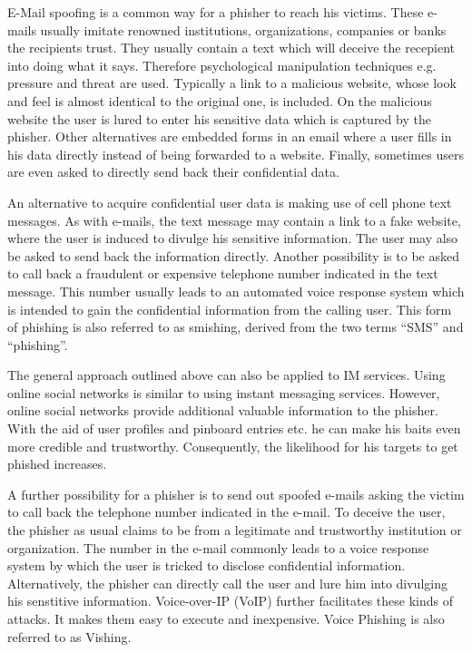 \label{s:attack_channels}
\begin{description}[leftmargin=0cm]
	\item[E-Mail] E-Mail spoofing is a common way for a phisher to reach his victims.
 These e-mails usually imitate renowned institutions, organizations, companies or banks the recipients trust.
 They usually contain a text which will deceive the recepient into doing what it says. Therefore psychological manipulation techniques e.g. pressure and threat are used.
 Typically a link to a malicious website, whose look and feel is almost identical to the original one, is included.
 On the malicious website the user is lured to enter his sensitive data which is captured by the phisher.
 Other alternatives are embedded forms in an email where a user fills in his data directly instead of being forwarded to a website.
 Finally, sometimes users are even asked to directly send back their confidential data.

	\item[SMS] An alternative to acquire confidential user data is making use of cell phone text messages.
 As with e-mails, the text message may contain a link to a fake website, where the user is induced to divulge his sensitive information.
 The user may also be asked to send back the information directly.
 Another possibility is to be asked to call back a fraudulent or expensive telephone number indicated in the text message.
 This number usually leads to an automated voice response system which is intended to gain the confidential information from the calling user.
 This form of phishing is also referred to as smishing, derived from the two terms ``SMS'' and ``phishing''.
 
	\item[Instant Messaging and Online Social Networks] The general approach outlined above can also be applied to IM services. Using online social networks is similar to using instant messaging services.
 However, online social networks provide additional valuable information to the phisher.
 With the aid of user profiles and pinboard entries etc.
 he can make his baits even more credible and trustworthy.
 Consequently, the likelihood for his targets to get phished increases.

	\item[Voice Phishing] A further possibility for a phisher is to send out spoofed e-mails asking the victim to call back the telephone number indicated in the e-mail.
 To deceive the user, the phisher as usual claims to be from a legitimate and trustworthy institution or organization.
 The number in the e-mail commonly leads to a voice response system by which the user is tricked to disclose confidential information.
 Alternatively, the phisher can directly call the user and lure him into divulging his senstitive information.
 Voice-over-IP (VoIP) further facilitates these kinds of attacks.
 It makes them easy to execute and inexpensive.
 Voice Phishing is also referred to as Vishing.

\end{description}

